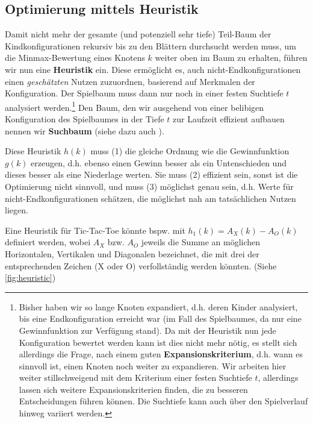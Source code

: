 \documentclass[a4paper,twoside]{scrartcl}
\makeatletter
\newcommand\footnoteref[1]{\protected@xdef\@thefnmark{\ref{#1}}\@footnotemark}
\newcommand\q[1]{\glqq #1\grqq}
\makeatother
\begin{document}
\subsection{Optimierung mittels Heuristik}
Damit nicht mehr der gesamte (und potenziell sehr tiefe) Teil-Baum der Kindkonfigurationen rekursiv bis zu den Blättern durchsucht werden muss, um die Minmax-Bewertung eines Knotens $k$ weiter oben im Baum zu erhalten, führen wir nun eine \textbf{Heuristik} ein. Diese ermöglicht es, auch nicht-Endkonfigurationen einen \textit{geschätzten} Nutzen zuzuordnen, basierend auf Merkmalen der Konfiguration. Der Spielbaum muss dann nur noch in einer festen Suchtiefe $t$ analysiert werden.\footnote{Bisher haben wir so lange Knoten expandiert, d.h. deren Kinder analysiert, bis eine Endkonfiguration erreicht war (im Fall des Spielbaumes, da nur eine Gewinnfunktion zur Verfügung stand). Da mit der Heuristik nun jede Konfiguration bewertet werden kann ist dies nicht mehr nötig, es stellt sich allerdings die Frage, nach einem guten \textbf{Expansionskriterium}, d.h. wann es sinnvoll ist, einen Knoten noch weiter zu expandieren. Wir arbeiten hier weiter stillschweigend mit dem Kriterium einer festen Suchtiefe $t$, allerdings lassen sich weitere Expansionskriterien finden, die zu besseren Entscheidungen führen können. Die Suchtiefe kann auch über den Spielverlauf hinweg variiert werden.} Den Baum, den wir ausgehend von einer belibigen Konfiguration des Spielbaumes in der Tiefe $t$ zur Laufzeit effizient aufbauen nennen wir \textbf{Suchbaum} (siehe dazu auch \footnoteref{suchbaum}).

Diese Heuristik $h(k)$ muss (1) die gleiche Ordnung wie die Gewinnfunktion $g(k)$ erzeugen, d.h. ebenso einen Gewinn besser als ein Untenschieden und dieses besser als eine Niederlage werten. Sie muss (2) effizient sein, sonst ist die Optimierung nicht sinnvoll, und muss (3) möglichst genau sein, d.h. Werte für nicht-Endkonfigurationen schätzen, die möglichst nah am tatsächlichen Nutzen liegen.

Eine Heuristik für Tic-Tac-Toe könnte bspw. mit $h_1(k) = A_X(k) - A_O(k)$ definiert werden, wobei $A_{X}$ bzw. $A_{O}$ jeweils die Summe an möglichen Horizontalen, Vertikalen und Diagonalen bezeichnet, die mit drei der entsprechenden Zeichen (\q{X} oder \q{O}) verfollständig werden könnten. (Siehe \ref{fig:heuristic})
\end{document}
